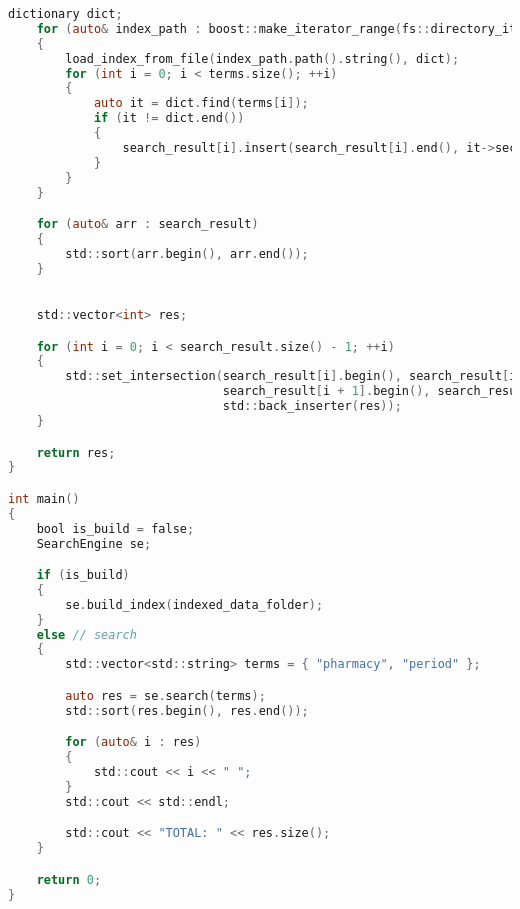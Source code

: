 \begin{lstlisting}[language=C]
	dictionary dict;
	for (auto& index_path : boost::make_iterator_range(fs::directory_iterator(indexed_data_folder_path), {}))
	{
		load_index_from_file(index_path.path().string(), dict);
		for (int i = 0; i < terms.size(); ++i)
		{
			auto it = dict.find(terms[i]);
			if (it != dict.end())
			{
				search_result[i].insert(search_result[i].end(), it->second.begin(), it->second.end());
			}
		}
	}

	for (auto& arr : search_result)
	{
		std::sort(arr.begin(), arr.end());
	}

	
	std::vector<int> res;

	for (int i = 0; i < search_result.size() - 1; ++i)
	{
		std::set_intersection(search_result[i].begin(), search_result[i].end(), 
							  search_result[i + 1].begin(), search_result[i + 1].end(),
							  std::back_inserter(res));
	}

	return res;
}

int main()
{
	bool is_build = false;
	SearchEngine se;

	if (is_build)
	{
		se.build_index(indexed_data_folder);
	}
	else // search
	{
		std::vector<std::string> terms = { "pharmacy", "period" };

		auto res = se.search(terms);
		std::sort(res.begin(), res.end());

		for (auto& i : res)
		{
			std::cout << i << " ";
		}
		std::cout << std::endl;

		std::cout << "TOTAL: " << res.size();
	}

	return 0;
}

\end{lstlisting}

